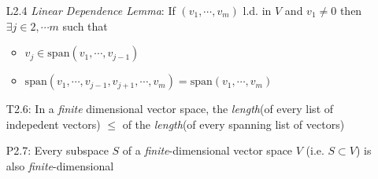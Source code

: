 \documentclass[11pt,notitlepage,oneside]{article}
\begin{document}
\begin{itemize}
\item[L2.4]\emph{Linear Dependence Lemma}: If $(v_1, \cdots, v_m)$ l.d. in $V$ and $v_1\neq 0$ then $\exists j\in 2,\cdots m$ such that
\begin{itemize}
  \item $v_j \in \mathrm{span}(v_1,\cdots, v_{j-1})$
  \item  $\mathrm{span}(v_1,\cdots, v_{j-1}, v_{j+1}, \cdots, v_m) = \mathrm{span}(v_1,\cdots, v_m)$
\end{itemize}
\item[T2.6:\label{it:T2_6}] In a \emph{finite} dimensional vector space, the \emph{length}(of every list of indepedent vectors) $\leq$ of the \emph{length}(of every spanning list of vectors)
\item[P2.7:] Every subspace $S$ of a \emph{finite}-dimensional vector space $V$ (i.e. $S\subset V$) is also \emph{finite}-dimensional
%


\end{itemize}
\end{document}
